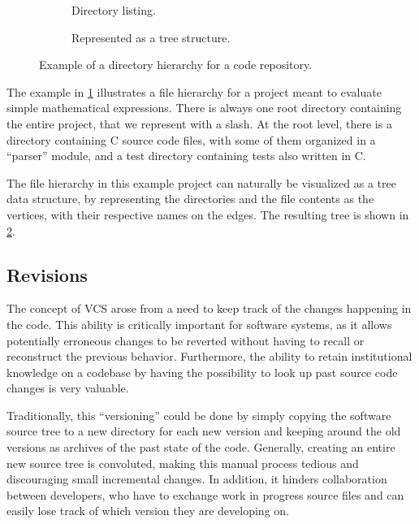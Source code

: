 \begin{figure}
    \centering
    \begin{subfigure}[b]{.40\textwidth}
        \caption{Directory listing.}
        \label{fig:vcs-dir-flat}
    \end{subfigure}\hfill
    \begin{subfigure}[b]{.58\textwidth}
        \centering
        
        \caption{Represented as a tree structure.}%
        \label{fig:vcs-dir-tree}
    \end{subfigure}
    \caption{Example of a directory hierarchy for a code repository.}
    \label{fig:vcs-dir-project}
\end{figure}

The example in \cref{fig:vcs-dir-flat} illustrates a file hierarchy for a
project meant to evaluate simple mathematical expressions. There is always one
root directory containing the entire project, that we represent with a slash.
At the root level, there is a directory containing C source code files, with
some of them organized in a ``parser'' module, and a test directory containing
tests also written in C.

The file hierarchy in this example project can naturally be visualized as a
tree data structure, by representing the directories and the file contents as
the vertices, with their respective names on the edges. The resulting tree is
shown in \cref{fig:vcs-dir-tree}.

\subsection{Revisions}

The concept of \acrlong{VCS} arose from a need to keep track of the
changes happening in the code. This ability is critically important for
software systems, as it allows potentially erroneous changes to be reverted
without having to recall or reconstruct the previous behavior. Furthermore, the
ability to retain institutional knowledge on a codebase by having the
possibility to look up past source code changes is very valuable.

Traditionally, this ``versioning'' could be done by simply copying the software
source tree to a new directory for each new version and keeping around the old
versions as archives of the past state of the code. Generally, creating an
entire new source tree is convoluted, making this manual process tedious and
discouraging small incremental changes. In addition, it hinders collaboration
between developers, who have to exchange work in progress source files and can
easily lose track of which version they are developing on.

